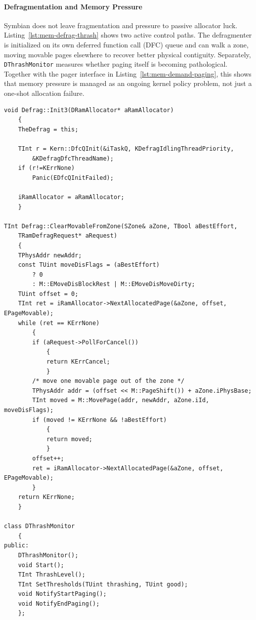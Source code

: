 \paragraph{Defragmentation and Memory Pressure}

Symbian does not leave fragmentation and pressure to passive allocator luck.
Listing~\ref{lst:mem-defrag-thrash} shows two active control paths. The
defragmenter is initialized on its own deferred function call (DFC) queue and
can walk a zone, moving movable pages elsewhere to recover better physical
contiguity. Separately, \texttt{DThrashMonitor} measures whether paging itself
is becoming pathological. Together with the pager interface in
Listing~\ref{lst:mem-demand-paging}, this shows that memory pressure is managed
as an ongoing kernel policy problem, not just a one-shot allocation failure.

\begin{listing}[H]
\begin{verbatim}
void Defrag::Init3(DRamAllocator* aRamAllocator)
	{
	TheDefrag = this;

	TInt r = Kern::DfcQInit(&iTaskQ, KDefragIdlingThreadPriority,
		&KDefragDfcThreadName);
	if (r!=KErrNone)
		Panic(EDfcQInitFailed);

	iRamAllocator = aRamAllocator;
	}

TInt Defrag::ClearMovableFromZone(SZone& aZone, TBool aBestEffort,
	TRamDefragRequest* aRequest)
	{
	TPhysAddr newAddr;
	const TUint moveDisFlags = (aBestEffort)
		? 0
		: M::EMoveDisBlockRest | M::EMoveDisMoveDirty;
	TUint offset = 0;
	TInt ret = iRamAllocator->NextAllocatedPage(&aZone, offset, EPageMovable);
	while (ret == KErrNone)
		{
		if (aRequest->PollForCancel())
			{
			return KErrCancel;
			}
		/* move one movable page out of the zone */
		TPhysAddr addr = (offset << M::PageShift()) + aZone.iPhysBase;
		TInt moved = M::MovePage(addr, newAddr, aZone.iId, moveDisFlags);
		if (moved != KErrNone && !aBestEffort)
			{
			return moved;
			}
		offset++;
		ret = iRamAllocator->NextAllocatedPage(&aZone, offset, EPageMovable);
		}
	return KErrNone;
	}

class DThrashMonitor
	{
public:
	DThrashMonitor();
	void Start();
	TInt ThrashLevel();
	TInt SetThresholds(TUint thrashing, TUint good);
	void NotifyStartPaging();
	void NotifyEndPaging();
	};
\end{verbatim}
\caption{Active defragmentation and thrash monitoring. Files:
\texttt{defragbase.cpp} and \texttt{flexible/mmu/mthrash.h}.}
\label{lst:mem-defrag-thrash}
\end{listing}

